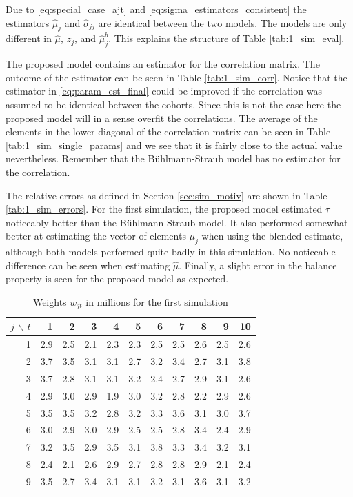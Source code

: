 \documentclass[11pt]{article}
\theoremstyle{definition}
\begin{document}
Due to \eqref{eq:special_case_ajt} and \eqref{eq:sigma_estimators_consistent} the estimators $\hat\mu_j$ and $\hat\sigma_{jj}$ are identical between the two models. The models are only different in $\hat\mu$, $z_j$, and $\hat\mu_j^b$. This explains the structure of Table \ref{tab:1_sim_eval}.

The proposed model contains an estimator for the correlation matrix. The outcome of the estimator can be seen in Table \ref{tab:1_sim_corr}. Notice that the estimator in \eqref{eq:param_est_final} could be improved if the correlation was assumed to be identical between the cohorts. Since this is not the case here the proposed model will in a sense overfit the correlations. The average of the elements in the lower diagonal of the correlation matrix can be seen in Table \ref{tab:1_sim_single_params} and we see that it is fairly close to the actual value nevertheless. Remember that the Bühlmann-Straub model has no estimator for the correlation.

The relative errors as defined in Section \ref{sec:sim_motiv} are shown in Table \ref{tab:1_sim_errors}. For the first simulation, the proposed model estimated $\tau$ noticeably better than the Bühlmann-Straub model. It also performed somewhat better at estimating the vector of elements $\mu_j$ when using the blended estimate, although both models performed quite badly in this simulation. No noticeable difference can be seen when estimating $\hat\mu$. Finally, a slight error in the balance property is seen for the proposed model as expected.

\begin{table}[H]
\label{tab:1_sim_w}
\centering
\caption{Weights $w_{jt}$ in millions for the first simulation}
\begin{tabular}{rrrrrrrrrrr}
  \hline
 $j\,\backslash\, t$& 1 & 2 & 3 & 4 & 5 & 6 & 7 & 8 & 9 & 10 \\ 
  \hline
1 & 2.9 & 2.5 & 2.1 & 2.3 & 2.3 & 2.5 & 2.5 & 2.6 & 2.5 & 2.6 \\ 
  2 & 3.7 & 3.5 & 3.1 & 3.1 & 2.7 & 3.2 & 3.4 & 2.7 & 3.1 & 3.8 \\ 
  3 & 3.7 & 2.8 & 3.1 & 3.1 & 3.2 & 2.4 & 2.7 & 2.9 & 3.1 & 2.6 \\ 
  4 & 2.9 & 3.0 & 2.9 & 1.9 & 3.0 & 3.2 & 2.8 & 2.2 & 2.9 & 2.6 \\ 
  5 & 3.5 & 3.5 & 3.2 & 2.8 & 3.2 & 3.3 & 3.6 & 3.1 & 3.0 & 3.7 \\ 
  6 & 3.0 & 2.9 & 3.0 & 2.9 & 2.5 & 2.5 & 2.8 & 3.4 & 2.4 & 2.9 \\ 
  7 & 3.2 & 3.5 & 2.9 & 3.5 & 3.1 & 3.8 & 3.3 & 3.4 & 3.2 & 3.1 \\ 
  8 & 2.4 & 2.1 & 2.6 & 2.9 & 2.7 & 2.8 & 2.8 & 2.9 & 2.1 & 2.4 \\ 
  9 & 3.5 & 2.7 & 3.4 & 3.1 & 3.1 & 3.2 & 3.1 & 3.6 & 3.1 & 3.2 \\ 
   \hline
\end{tabular}
\end{table}
\end{document}
